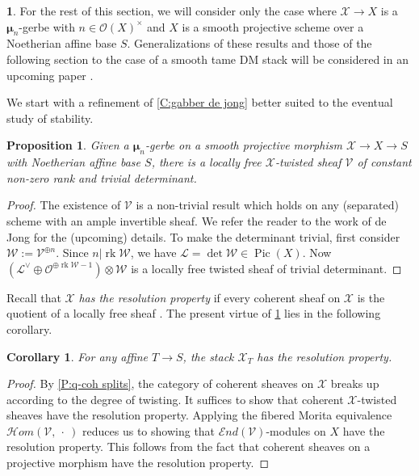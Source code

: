 \documentclass[11pt]{amsart}
\newcommand{\ms}[1]{\mathscr #1}
\newcommand{\shom}{\ms H\!om}
\newcommand{\send}{\ms E\!nd}
\DeclareMathOperator{\Pic}{Pic}
\newcommand{\m}{\boldsymbol{\mu}}
\renewcommand{\[}{[\!\hspace{0.03em}[}
\renewcommand{\]}{]\!\hspace{0.03em}]}
\renewcommand{\(}{(\!\hspace{0.03em}(}
\renewcommand{\)}{)\!\hspace{0.03em})}
\DeclareMathOperator*{\tensor}{\otimes}
\DeclareMathOperator{\rk}{\operatorname{rk}}
\newtheorem{prop}[lem]{Proposition}
\newtheorem{cor}[lem]{Corollary}
\theoremstyle{definition}
\newtheorem{para}[lem]{\indent}
\theoremstyle{remark}
\begin{document}
\begin{para} For the rest of this section, we will consider only the 
case where $\ms X\to X$ is a $\m_{n}$-gerbe with $n\in{\ms O}(X)^{\times}$ 
and $X$ is a smooth projective scheme over a Noetherian affine base 
$S$.  Generalizations of these results and those of the following section to the case of a smooth tame DM stack will be considered in an upcoming paper \cite{orbifoldmoduli}.

We start with a refinement of \ref{C:gabber de jong} better suited to 
the eventual study of stability.

\begin{prop}\label{P:de jong gabber makes me quiver} Given a $\m_{n}$-gerbe on a smooth 
projective morphism $\ms X\to X\to S$ with Noetherian affine base $S$, there is a locally free $\ms 
X$-twisted sheaf $\ms V$ of constant non-zero rank and trivial determinant.
\end{prop}
\begin{proof} The existence of $\ms V$ is a non-trivial result which 
holds on any (separated) scheme with an ample invertible sheaf.  We 
refer the reader to the work of de Jong \cite{dejong-gabber} for the (upcoming) 
details.  To make the determinant trivial, first consider $\ms W:=\ms 
V^{\oplus n}$.  Since $n|\rk\ms W$, we have $\ms L=\det\ms W\in\Pic(X)$.  
Now $(\ms L^{\vee}\oplus{\ms O}^{\oplus \rk\ms W-1})\tensor\ms W$ is a 
locally free twisted sheaf of trivial determinant.
\end{proof}
\end{para}

Recall that $\ms X$ \emph{has the resolution property\/} if every 
coherent sheaf on $\ms X$ is the quotient of a locally free sheaf 
\cite{totaro}.  The present virtue of \ref{P:de jong gabber makes me quiver} 
lies in the following corollary.
\begin{cor} For any affine $T\to S$, the stack $\ms X_{T}$ has the 
resolution property.
\end{cor}
\begin{proof} By \ref{P:q-coh splits}, the category of coherent sheaves on $\ms X$ breaks up 
according to the degree of twisting.  It suffices to show that 
coherent $\ms X$-twisted sheaves have the resolution property.  
Applying the fibered Morita equivalence $\shom(\ms V,\ \cdot\ )$ 
reduces us to showing that $\send(\ms V)$-modules on $X$ have the 
resolution property.  This follows from the fact that coherent sheaves 
on a projective morphism have the resolution property.
\end{proof}
\end{document}
